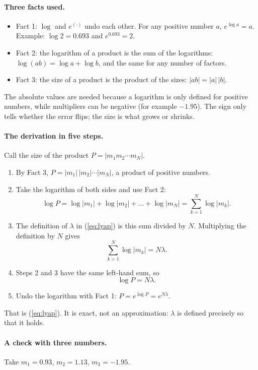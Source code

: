 \documentclass[11pt]{article}
\begin{document}
\paragraph{Three facts used.}
\begin{itemize}
\item Fact 1: $\log$ and $e^{(\cdot)}$ undo each other. For any positive number $a$, $e^{\log a}=a$. Example: $\log 2=0.693$ and $e^{0.693}=2$.
\item Fact 2: the logarithm of a product is the sum of the logarithms: $\log(ab)=\log a+\log b$, and the same for any number of factors.
\item Fact 3: the size of a product is the product of the sizes: $|ab|=|a|\,|b|$.
\end{itemize}
The absolute values are needed because a logarithm is only defined for positive numbers, while multipliers can be negative (for example $-1.95$). The sign only tells whether the error flips; the size is what grows or shrinks.

\paragraph{The derivation in five steps.} Call the size of the product $P=|m_1m_2\cdots m_N|$.
\begin{enumerate}
\item By Fact 3, $P=|m_1|\,|m_2|\cdots|m_N|$, a product of positive numbers.
\item Take the logarithm of both sides and use Fact 2:
\begin{equation}
\log P=\log|m_1|+\log|m_2|+\dots+\log|m_N|=\sum_{k=1}^{N}\log|m_k| .
\end{equation}
\item The definition of $\lambda$ in (\ref{eq:lyap}) is this sum divided by $N$. Multiplying the definition by $N$ gives
\begin{equation}
\sum_{k=1}^{N}\log|m_k|=N\lambda .
\end{equation}
\item Steps 2 and 3 have the same left-hand sum, so
\begin{equation}
\log P=N\lambda .
\end{equation}
\item Undo the logarithm with Fact 1: $P=e^{\log P}=e^{N\lambda}$.
\end{enumerate}
That is (\ref{eq:lyap}). It is exact, not an approximation: $\lambda$ is defined precisely so that it holds.

\paragraph{A check with three numbers.} Take $m_1=0.93$, $m_2=1.13$, $m_3=-1.95$.
\end{document}
